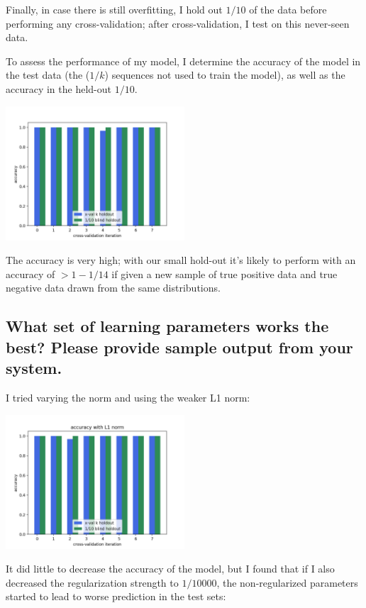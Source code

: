 \documentclass[]{article}
\begin{document}
Finally, in case there is still overfitting, I hold out $1/10$ of the data before performing any cross-validation; after cross-validation, I test on this never-seen data.

To assess the performance of my model, I determine the accuracy of the model in the test data (the ($1/k$) sequences not used to train the model), as well as the accuracy in the held-out $1/10$.

\vspace{1em}
\includegraphics[width=0.5\textwidth]{xvalAccuracy.png}
\vspace{1em}

The accuracy is very high; with our small hold-out it's likely to perform with an accuracy of $> 1 - 1/14$ if given a new sample of true positive data and true negative data drawn from the same distributions.

\subsection{What set of learning parameters works the best? Please provide sample output from your system.}

I tried varying the norm and using the weaker L1 norm:

\vspace{1em}
\includegraphics[width=0.5\textwidth]{xvalAccuracyL1.png}
\vspace{1em}

It did little to decrease the accuracy of the model, but I found that if I also decreased the regularization strength to $1/10000$, the non-regularized parameters started to lead to worse prediction in the test sets:
\end{document}
